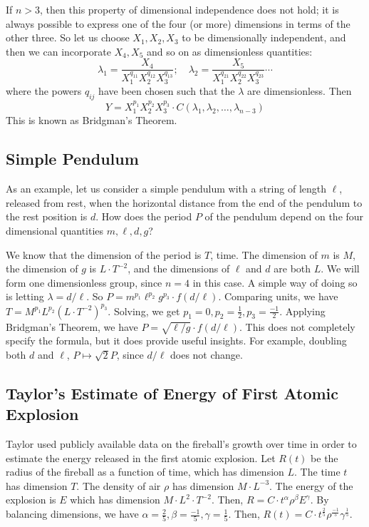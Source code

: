 \documentclass{article}
\begin{document}
If $n > 3$, then this property of dimensional independence does not hold; it is always possible to express one of the four (or more) dimensions in terms of the other three. So let us choose $X_1, X_2, X_3$ to be dimensionally independent, and then we can incorporate $X_4, X_5$ and so on as dimensionless quantities:
\[ \lambda_1 = \frac{X_4}{X_1^{q_{11}}X_2^{q_{12}}X_3^{q_{13}}};\quad \lambda_2 = \frac{X_5}{X_1^{q_{21}}X_2^{q_{22}}X_3^{q_{23}}} \cdots \]
where the powers $q_{ij}$ have been chosen such that the $\lambda$ are dimensionless. Then
\[ Y = X_1^{p_1}X_2^{p_2}X_3^{p_3} \cdot C(\lambda_1, \lambda_2, \dots, \lambda_{n-3}) \]
This is known as Bridgman's Theorem.

\subsection{Simple Pendulum}
As an example, let us consider a simple pendulum with a string of length $\ell$, released from rest, when the horizontal distance from the end of the pendulum to the rest position is $d$. How does the period $P$ of the pendulum depend on the four dimensional quantities $m, \ell, d, g$?

We know that the dimension of the period is $T$, time. The dimension of $m$ is $M$, the dimension of $g$ is $L \cdot T^{-2}$, and the dimensions of $\ell$ and $d$ are both $L$. We will form one dimensionless group, since $n=4$ in this case. A simple way of doing so is letting $\lambda = d/\ell$. So $P = m^{p_1} \ell^{p_2} g^{p_3} \cdot f(d/\ell)$. Comparing units, we have $T = M^{p_1} L^{p_2} (L \cdot T^{-2})^{p_3}$. Solving, we get $p_1 = 0, p_2 = \frac{1}{2}, p_3 = \frac{-1}{2}$. Applying Bridgman's Theorem, we have $P = \sqrt{\ell / g} \cdot f(d/\ell)$. This does not completely specify the formula, but it does provide useful insights. For example, doubling both $d$ and $\ell$, $P \mapsto \sqrt{2} P$, since $d/\ell$ does not change.

\subsection{Taylor's Estimate of Energy of First Atomic Explosion}
Taylor used publicly available data on the fireball's growth over time in order to estimate the energy released in the first atomic explosion. Let $R(t)$ be the radius of the fireball as a function of time, which has dimension $L$. The time $t$ has dimension $T$. The density of air $\rho$ has dimension $M \cdot L^{-3}$. The energy of the explosion is $E$ which has dimension $M \cdot L^2 \cdot T^{-2}$. Then, $R = C \cdot t^\alpha \rho^\beta E^\gamma$. By balancing dimensions, we have $\alpha = \frac{2}{5}, \beta = \frac{-1}{5}, \gamma = \frac{1}{5}$. Then, $R(t) = C \cdot t^{\frac{2}{5}} \rho^{\frac{-1}{5}} \gamma^{\frac{1}{5}}$.
\end{document}
